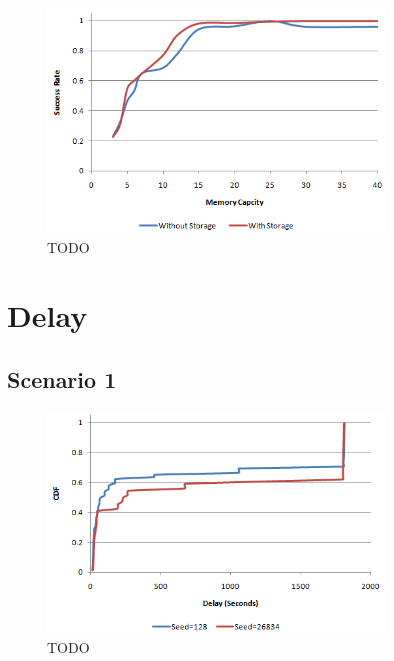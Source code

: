 \begin{figure}[htbp]
    \centering
    \includegraphics[width=0.8\textwidth]{images/result_sccess_sim2byss_128}
    \caption{TODO}
\end{figure}


\section{Delay}

\subsection{Scenario 1}

\begin{figure}[htbp]
    \centering
    \includegraphics[width=0.8\textwidth]{images/result_delay_sim1byseed_mc3}
    \caption{TODO}
\end{figure}


